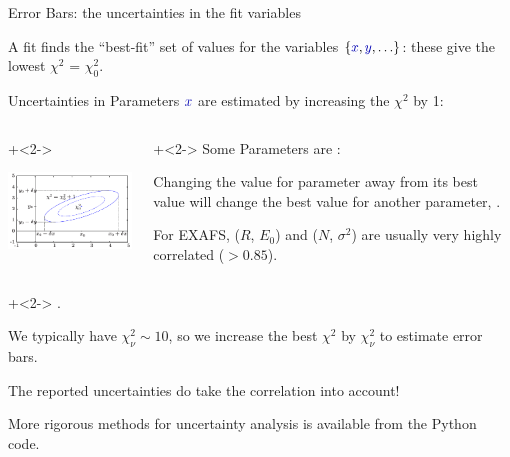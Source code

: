 \begin{slide}{Error Bars: the uncertainties in the fit variables}

\begin{cenpage}{135mm}
A fit finds the ``best-fit'' set of values for the variables $\{\Blue{x},
{\Blue{y}}, \ldots\}$:  these  give the lowest  $\chi^2$ = $\chi^2_0$.

\begin{center} Uncertainties in Parameters $\Blue{x}$ are estimated by increasing the
  $\chi^2$ by 1:
\end{center}


\begin{columns}
\begin{column}{65mm}

\onslide+<2->

 \includegraphics[width=62mm]{figs/errors/ellipse}

\end{column}
\begin{column}{60mm}

{\onslide+<2->
Some Parameters are {}:

\vmm

Changing the value for parameter {} away from its best value will change the best value
for another parameter, {}.

\vmm

\begin{postitbox}{53mm}
  For EXAFS, ($R$, $E_0$) and ($N$, $\sigma^2$) are usually very highly
  correlated ($>0.85$).
\end{postitbox}
\vmm
}
\end{column}
\end{columns}

 \onslide+<2-> \vmm
 {}.

 \vmm We typically have  $\chi^2_\nu \sim 10$,  so we increase the best $\chi^2$ by $\chi^2_\nu$ to estimate error bars.

\vmm
The reported uncertainties do take the correlation into account!

\vmm
More rigorous methods for uncertainty analysis is available from the {\larch}
Python code.



\vmm \vmm
\end{cenpage}

\end{slide}

